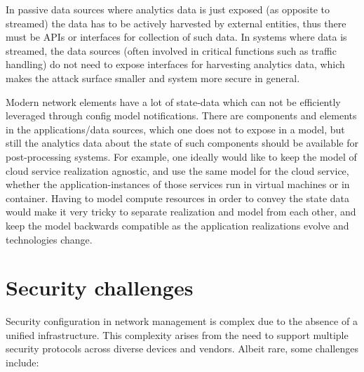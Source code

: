 \documentclass[10pt,sigconf]{iabart}
\begin{document}
In passive data sources where analytics data is just exposed (as opposite to streamed) the data has to be actively harvested by external entities, thus there must be APIs or interfaces for collection of such data. In systems where data is streamed, the data sources (often involved in critical functions such as traffic handling) do not need to expose interfaces for harvesting analytics data, which makes the attack surface smaller and system more secure in general.

Modern network elements have a lot of state-data which can not be efficiently leveraged through config model notifications. There are components and elements in the applications/data sources, which one does not to expose in a model, but still the analytics data about the state of such components should be available for post-processing systems. For example, one ideally would like to keep the model of cloud service realization agnostic, and use the same model for the cloud service, whether the application-instances of those services run in virtual machines or in container. Having to model compute resources in order to convey the state data would make it very tricky to separate realization and model from each other, and keep the model backwards compatible as the application realizations evolve and technologies change.






\section{Security challenges} \label{security}

Security configuration in network management is complex due to the absence of a unified infrastructure. This complexity arises from the need to support multiple security protocols across diverse devices and vendors. Albeit rare, some challenges include:
\end{document}
